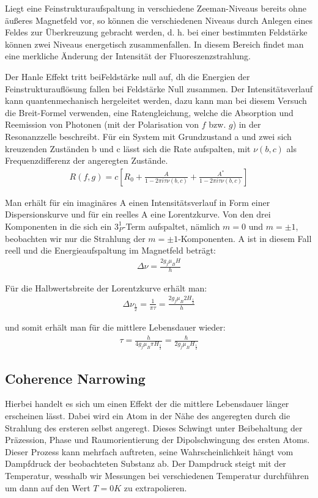 \documentclass[12pt]{article}
\begin{document}
Liegt eine Feinstrukturaufspaltung in verschiedene Zeeman-Niveaus bereits ohne äußeres Magnetfeld vor, so können die verschiedenen Niveaus durch Anlegen eines Feldes zur Überkreuzung gebracht werden, d. h. bei einer bestimmten Feldstärke können zwei Niveaus energetisch zusammenfallen. In diesem Bereich findet man eine merkliche Änderung der Intensität der Fluoreszenzstrahlung.

Der Hanle Effekt tritt beiFeldstärke null auf, dh die Energien der Feinstrukturauflösung fallen bei Feldstärke Null zusammen. Der Intensitätsverlauf kann quantenmechanisch hergeleitet werden, dazu kann man bei diesem Versuch die Breit-Formel verwenden, eine Ratengleichung, welche die Absorption und Reemission von Photonen (mit der Polarisation von $f$ bzw. $g$) in der Resonanzzelle beschreibt. Für ein System mit Grundzustand a und zwei sich kreuzenden Zuständen b und c lässt sich die Rate aufspalten, mit $\nu(b,c)$ als Frequenzdifferenz der angeregten Zustände.
\begin{align}
 R(f,g)=c\left[ R_0+\frac{A}{1-2\pi i \tau \nu (b,c)}+\frac{A^*}{1-2\pi i \tau \nu (b,c)}\right]
\end{align}

Man erhält für ein imaginäres A einen Intensitätsverlauf in Form einer Dispersionskurve und für ein reelles A eine Lorentzkurve. Von den drei Komponenten in die sich ein $3_P^1$-Term aufspaltet, nämlich $m = 0$ und $m = \pm 1$, beobachten wir nur die Strahlung der $m = \pm1$-Komponenten. A ist in diesem Fall reell und die Energieaufspaltung im Magnetfeld beträgt:
\begin{align}
 \Delta \nu = \frac{2 g_j \mu_B H}{h}
\end{align}

Für die Halbwertsbreite der Lorentzkurve erhält man:
\begin{align}
 \Delta \nu_{\frac{1}{2}} = \frac{1}{\pi \tau} = \frac{2 g_j \mu_B 2 H_{\frac{1}{2}}}{h}
\end{align}

und somit erhält man für die mittlere Lebensdauer wieder:
\begin{align}
 \label{livetime_quantum} \tau = \frac{h}{4 g_j \mu_B \pi H_{\frac{1}{2}}} = \frac{\hbar}{2 g_j \mu_B H_{\frac{1}{2}}}
\end{align}

\subsection{Coherence Narrowing}
Hierbei handelt es sich um einen Effekt der die mittlere Lebensdauer länger erscheinen lässt. Dabei wird ein Atom in der Nähe des angeregten durch die Strahlung des ersteren selbst angeregt. Dieses Schwingt unter Beibehaltung der Präzession, Phase und Raumorientierung der Dipolschwingung des ersten Atoms. Dieser Prozess kann mehrfach auftreten, seine Wahrscheinlichkeit hängt vom Dampfdruck der beobachteten Substanz ab. Der Dampdruck steigt mit der Temperatur, wesshalb wir Messungen bei verschiedenen Temperatur durchführen um dann auf den Wert $T=0K$ zu extrapolieren.
\newpage
\end{document}
